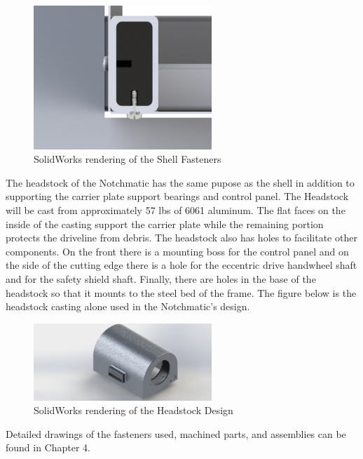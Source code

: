\begin{figure}[H]
    \centering
    \includegraphics[width=0.6\textwidth]{./fall-report pictures/Chapter2-MachineDescription/ShellBolt}
    \caption{SolidWorks rendering of the Shell Fasteners}
    \label{fig:ShellBolts}
\end{figure}

\newpage
The headstock of the Notchmatic has the same pupose as the shell in addition to supporting the carrier plate support bearings and control panel. The Headstock will be cast from approximately 57 lbs of 6061 aluminum. The flat faces on the inside of the casting support the carrier plate while the remaining portion protects the driveline from debris. The headstock also has holes to facilitate other components. On the front there is  a mounting boss for the control panel and on the side of the cutting edge there is a hole for the eccentric drive handwheel shaft and for the safety shield shaft. Finally, there are holes in the base of the headstock so that it mounts to the steel bed of the frame. The figure below is the headstock casting alone used in the Notchmatic's design.

\begin{figure}[H]
    \centering
    \includegraphics[width=0.6\textwidth]{./fall-report pictures/Chapter2-MachineDescription/Headstock}
    \caption{SolidWorks rendering of the Headstock Design}
    \label{fig:Headstock}
\end{figure}

Detailed drawings of the fasteners used, machined parts, and assemblies can be found in Chapter 4.

